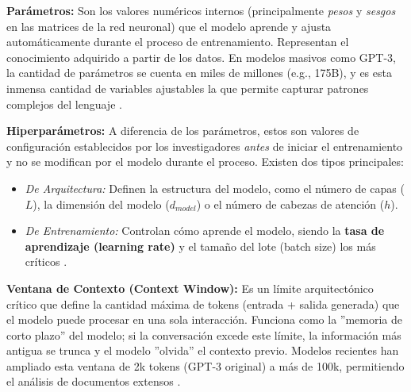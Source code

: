 \documentclass[11pt, a4paper]{article}
\begin{document}
\begin{description}
    \item{\textbf{Parámetros:}}
    Son los valores numéricos internos (principalmente \textit{pesos} y \textit{sesgos} en las matrices de la red neuronal) que el modelo aprende y ajusta automáticamente durante el proceso de entrenamiento.
    Representan el conocimiento adquirido a partir de los datos. En modelos masivos como GPT-3, la cantidad de parámetros se cuenta en miles de millones (e.g., 175B), y es esta inmensa cantidad de variables
    ajustables la que permite capturar patrones complejos del lenguaje \cite{atkinson2025}.

    \item{\textbf{Hiperparámetros:}}
    A diferencia de los parámetros, estos son valores de configuración establecidos por los investigadores \textit{antes} de iniciar el entrenamiento y no se modifican por el modelo durante el proceso. 
    Existen dos tipos principales:
    \begin{itemize}
        \item \textit{De Arquitectura:} Definen la estructura del modelo, como el número de capas ($L$), la dimensión del modelo ($d_{model}$) o el número de cabezas de atención ($h$).
        \item \textit{De Entrenamiento:} Controlan cómo aprende el modelo, siendo la \textbf{tasa de aprendizaje (learning rate)} y el tamaño del lote (batch size) los más críticos 
        \cite{atkinson2025, kaplan_scaling_2020}.
    \end{itemize}

    \item{\textbf{Ventana de Contexto (Context Window):}}
    Es un límite arquitectónico crítico que define la cantidad máxima de tokens (entrada + salida generada) que el modelo puede procesar en una sola interacción. Funciona como la ''memoria de corto plazo'' del
    modelo; si la conversación excede este límite, la información más antigua se trunca y el modelo ''olvida'' el contexto previo. Modelos recientes han ampliado esta ventana de 2k tokens (GPT-3 original) a más
    de 100k, permitiendo el análisis de documentos extensos \cite{nvidia2023, brown_language_nodate}.


\end{description}
\end{document}
